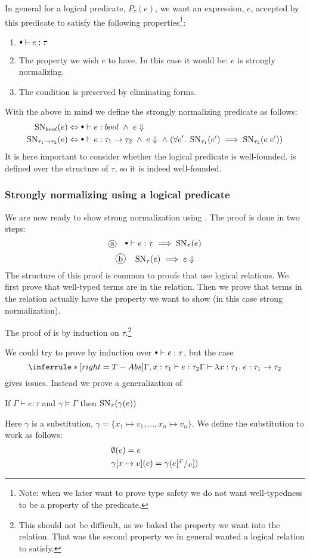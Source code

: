 In general for a logical predicate, $P_\tau(e)$, we want an expression, $e$, accepted by this predicate to satisfy the following properties\footnote{Note: when we later want to prove type safety we do not want well-typedness to be a property of the predicate.}:
\begin{enumerate}
\item $\mtenv \vdash e : \tau$
\item The property we wish $e$ to have. In this case it would be: $e$ is strongly normalizing.
\item The condition is preserved by eliminating forms.
\end{enumerate}
With the above in mind we define the strongly normalizing predicate as follows:
\begin{align*}
  \SN{bool}{e} & \Leftrightarrow \mtenv \vdash e : bool \pand e \Downarrow \\
  \SN{\tarrow{\tau_1}{\tau_2}}{e} & \Leftrightarrow \mtenv \vdash e : \tarrow{\tau_1}{\tau_2} \pand e \Downarrow \pand (\forall e'. \; \SN{\tau_1}{e'} \implies \SN{\tau_2}{e \; e'})\\
\end{align*}
It is here important to consider whether the logical predicate is well-founded.  is defined over the structure of $\tau$, so it is indeed well-founded.
\subsubsection*{Strongly normalizing using a logical predicate}
We are now ready to show strong normalization using . The proof is done in two steps:
\[
\circled{a} \quad \mtenv \vdash e : \tau \implies \SN{\tau}{e}
\]
\[
\circled{b} \quad \SN{\tau}{e} \implies e \Downarrow
\]
The structure of this proof is common to proofs that use logical relations. We first prove that well-typed terms are in the relation. Then we prove that terms in the relation actually have the property we want to show (in this case strong normalization).

The proof of  is by induction on $\tau$.\footnote{This should not be difficult, as we baked the property we want into the relation. That was the second property we in general wanted a logical relation to satisfy.}

We could try to prove  by induction over $\mtenv \vdash e : \tau$, but the case
\[
  \TAbs
\]
gives issues. Instead we prove a generalization of 
\begin{astrnorm}
  If $\Gamma \vdash e : \tau$ and $\gamma \models \Gamma$ then $\operatorname{SN}_{\tau}(\gamma(e))$
\end{astrnorm}
Here $\gamma$ is a substitution, $\gamma = \{x_1 \mapsto v_1, \dots , x_n \mapsto v_n\}$. We define the substitution to work as follows:
\begin{align*}
  & \emptyset (e) = e \\
  & \gamma \lbrack x \mapsto v \rbrack(e) = \gamma(e[^{\textstyle x}/_{\textstyle v}])
\end{align*}

